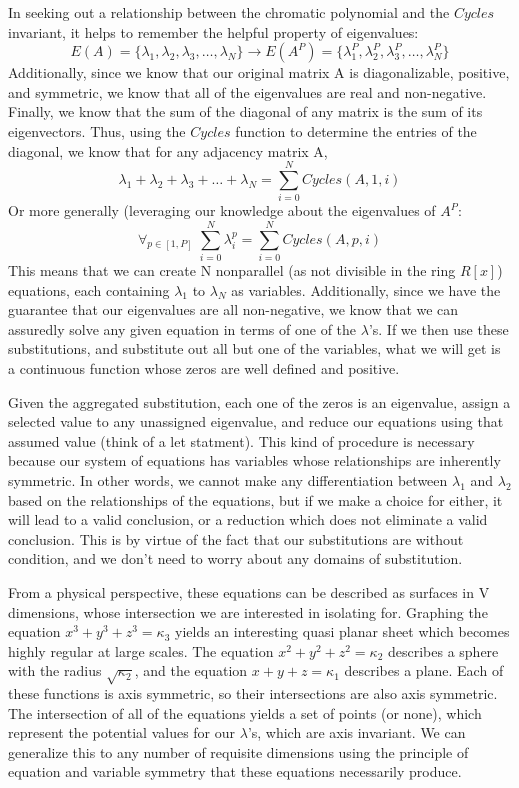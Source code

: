 In seeking out a relationship between the chromatic polynomial and the $Cycles$ invariant, it helps to remember the helpful property of  eigenvalues:
$$E(A) = \{\lambda_1,\lambda_2,\lambda_3, \dots, \lambda_N\} \rightarrow E(A^P) = \{\lambda_1^P,\lambda_2^P,\lambda_3^P, \dots, \lambda_N^P\} $$
Additionally, since we know that our original matrix A is diagonalizable, positive, and symmetric, we know that all of the eigenvalues are real and non-negative. 
Finally, we know that the sum of the diagonal of any matrix is the sum of its eigenvectors. 
Thus, using the $Cycles$ function to determine the entries of the diagonal, we know that for any adjacency matrix A,
$$\lambda_1 + \lambda_2 + \lambda_3 + \dots + \lambda_N = \sum_{i = 0}^{N}{Cycles(A, 1, i)}$$
Or more generally (leveraging our knowledge about the eigenvalues of $A^P$:
$$ \forall_{p \in [1, P]} \; \sum_{i = 0}^N{\lambda_i^p} =  \sum_{i = 0}^{N}{Cycles(A, p, i)}$$
This means that we can create N nonparallel (as not divisible in the ring $R[x]$) equations, each containing $\lambda_1$ to $\lambda_N$ as variables.
Additionally, since we have the guarantee that our eigenvalues are all non-negative, we know that we can assuredly solve any given equation in terms of one of the $\lambda$'s.
If we then use these substitutions, and substitute out all but one of the variables, what we will get is a continuous function whose zeros are well defined and positive. 

Given the aggregated substitution, each one of the zeros is an eigenvalue, assign a selected value to any unassigned eigenvalue, and reduce our equations using that assumed value (think of a let statment).
This kind of procedure is necessary because our system of equations has variables whose relationships are inherently symmetric.
In other words, we cannot make any differentiation between $\lambda_1$ and $\lambda_2$ based on the relationships of the equations, but if we make a choice for either, it will lead to a valid conclusion, or a reduction which does not eliminate a valid conclusion.
This is by virtue of the fact that our substitutions are without condition, and we don't need to worry about any domains of substitution.

From a physical perspective, these equations can be described as surfaces in V dimensions, whose intersection we are interested in isolating for. 
Graphing the equation $x^3 + y^3 + z^3 = \kappa_3$ yields an interesting quasi planar sheet which becomes highly regular at large scales.  
The equation $x^2 + y^2 + z^2 = \kappa_2$ describes a sphere with the radius $\sqrt{\kappa_2}$, and the equation $x + y + z = \kappa_1$ describes a plane. 
Each of these functions is axis symmetric, so their intersections are also axis symmetric.  
The intersection of all of the equations yields a set of points (or none), which represent the potential values for our $\lambda$'s, which are axis invariant. 
We can generalize this to any number of requisite dimensions using the principle of equation and variable symmetry that these equations necessarily produce.

